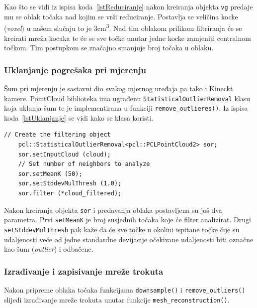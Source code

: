 Kao što se vidi iz ispisa koda~\ref{lstReduciranje} nakon kreiranja
objekta \texttt{vg} predaje mu se oblak točaka nad kojim se vrši
reduciranje. Postavlja se veličina kocke (\textit{voxel}) u našem
slučaju to je 3cm\textsuperscript{3}. Nad tim oblakom prilikom
filtriranja će se kreirati mreža kocaka te će se sve točke unutar jedne
kocke zamjeniti centralnom točkom. Tim postupkom se značajno smanjuje
broj točaka u oblaku.


\subsubsection{Uklanjanje pogrešaka pri mjerenju} %
\label{ssub:Uklanjanje pogrešaka pri mjerenju}
Šum pri mjerenju je sastavni dio svakog mjernog uređaja pa tako i
Kineckt kamere. PointCloud biblioteka ima ugrađenu
\texttt{StatisticalOutlierRemoval} klasu koja uklanja šum te je
implementirana u funkciji \texttt{remove\_outlieres()}.
Iz ispisa koda~\ref{lstUklanjanje} se vidi kako se klasa koristi.

\begin{minipage}{\textwidth}
\begin{lstlisting}[label=lstUklanjanje, caption={Dio izvornog koda za
uklanjanje pogrešaka pri mjerenju iz funkcije \texttt{remove\_outliers()} }]
    // Create the filtering object
    pcl::StatisticalOutlierRemoval<pcl::PCLPointCloud2> sor;
    sor.setInputCloud (cloud);
    // Set number of neighbors to analyze
    sor.setMeanK (50);
    sor.setStddevMulThresh (1.0);
    sor.filter (*cloud_filtered);
\end{lstlisting}
\end{minipage}

Nakon kreiranja objekta \texttt{sor} i predavanja oblaka postavljena su
još dva parametra. Prvi \texttt{setMeanK} je broj susjednih točaka koje
će filter analizirat. Drugi \texttt{setStddevMulThresh} pak kaže da će
sve točke u okolini ispitane točke čije su udaljenosti veće od jedne
standardne devijacije očekivane udaljenosti biti označne kao šum
(\textit{outlier}) i odbačene.


\subsubsection{Izrađivanje i zapisivanje mreže trokuta} %
\label{ssub:Izradivanje i zapisivanje mreže trokuta}

Nakon pripreme oblaka točaka funkcijama \texttt{downsample()} i
\texttt{remove\_outliers()} slijedi izrađivanje mreže trokuta unutar
funkcije \texttt{mesh\_reconstruction()}. 



